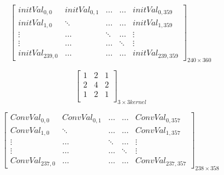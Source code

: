 \noindent\begin{minipage}{.3\textwidth}
\[
\begin{bmatrix}

initVal_{0,0} & initVal_{0,1} & \ldots & \ldots & initVal_{0,359}\\

initVal_{1,0} & \ddots & \ldots & \ldots & initVal_{1,359}\\

\vdots & \ldots & \ddots & \ldots & \vdots\\

\vdots & \ldots & \ldots & \ddots & \vdots\\

initVal_{239,0} & \ldots & \ldots  & \ldots & initVal_{239,359}

\end{bmatrix}_{240\times 360}
\]
\end{minipage}\hfill
\begin{minipage}{.3\textwidth}
\[
\begin{bmatrix}

1 & 2 & 1\\

2 & 4 & 2\\

1 & 2 & 1\\

\end{bmatrix}_{3\times 3 kernel}
\]
\end{minipage}

\vspace{5mm}

\[
\begin{bmatrix}

ConvVal_{0,0} & ConvVal_{0,1} & \ldots & \ldots & ConvVal_{0,357}\\

ConvVal_{1,0} & \ddots & \ldots & \ldots & ConvVal_{1,357}\\

\vdots & \ldots & \ddots & \ldots & \vdots\\

\vdots & \ldots & \ldots & \ddots & \vdots\\

ConvVal_{237,0} & \ldots & \ldots  & \ldots & ConvVal_{237,357}

\end{bmatrix}_{238\times 358}
\]

